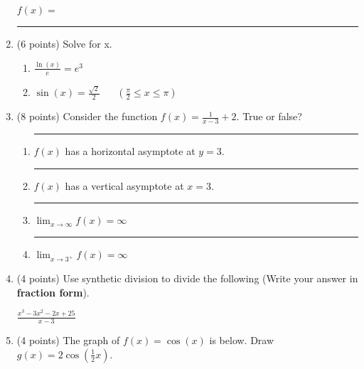 \documentclass[11pt]{article}
\begin{document}
\begin{enumerate}
\begin{flushright}
$f(x) =$ \rule{4cm}{0.4pt}
\end{flushright}


\newpage



\item (6 points) Solve for x.
\begin{multicols}{2}
\begin{enumerate}[itemsep=50pt]
    \item $\displaystyle \frac{\ln(x)}{e} = e^3$
    \item $\displaystyle \sin(x)=\frac{\sqrt{2}}{2} \hspace{20pt} \left(\frac{\pi}{2} \leq x \leq \pi \right)$
\end{enumerate}
\end{multicols}
\vspace{100pt}


\item (8 points) Consider the function $f(x) = \frac{1}{x-3} + 2$. True or false?
\begin{enumerate}[itemsep=20pt]
    \item \rule{1cm}{0.4pt} $f(x)$ has a horizontal asymptote at $y=3$.
    \item \rule{1cm}{0.4pt} $f(x)$ has a vertical asymptote at $x=3$.
    \item \rule{1cm}{0.4pt} $\displaystyle{\lim_{x \to \infty} f(x) = \infty}$
    \item \rule{1cm}{0.4pt} $\displaystyle{\lim_{x \to 3^+} f(x) = \infty}$
\end{enumerate}
\vspace{20pt}

\item (4 points) Use synthetic division to divide the following (Write your answer in \textbf{fraction form}).

\vspace{10pt}
$\displaystyle{\frac{x^3 - 3x^2 - 2x + 25}{x-3}} $
\vspace{100pt}


\newpage


\item (4 points) The graph of $f(x)=\cos(x)$ is below. Draw $g(x)=2\cos(\frac{1}{2}x)$.
\vspace{4pt}
\begin{center}
\end{center}



\end{enumerate}
\end{document}
